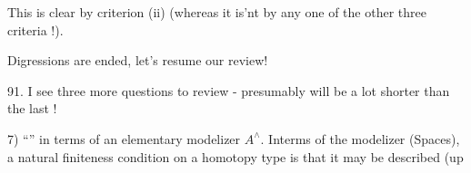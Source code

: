 This is clear by criterion (ii)  (whereas it is'nt by any one of
the other three criteria !).

Digressions are ended,  let's resume our review!

91.   I see three more questions to review -  presumably  will be
a lot shorter than the last !

7)  \hand{\uline{\textcolor{black}{Description of homotopy types}}} ``\hand{\uline{\textcolor{black}{of finite type}}}''\hand{,} in terms of an
elementary modelizer $A^{\wedge}$.  Interms of the modelizer (Spaces), a natural
finiteness condition on a homotopy type is that it may be described (up

